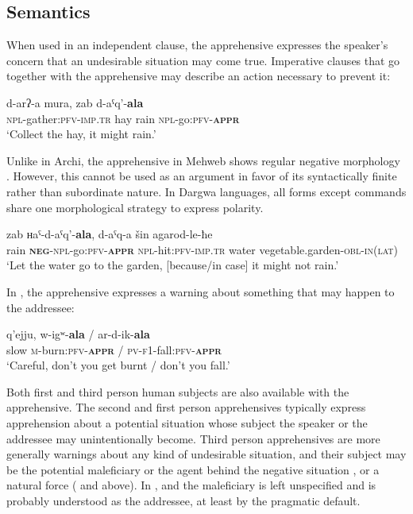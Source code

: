 \documentclass[output=paper,colorlinks,citecolor=brown]{langscibook}
\begin{document}
\subsection{Semantics}
\label{subsec:Msem}
 
When used in an independent clause, the apprehensive expresses the speaker's concern that an undesirable situation may come true. Imperative clauses that go together with the apprehensive may describe an action necessary to prevent it:
 

\ea \label{ex:DD34}
\gll d-arʔ-a mura, zab d-aˤq'-\textbf{ala} \\
\textsc{npl}-gather:\textsc{pfv-imp.tr} hay rain \textsc{npl}-go:\textsc{pfv-\textbf{appr}} \\
\glt `Collect the hay, it might rain.'
\z

 Unlike in Archi, the apprehensive in Mehweb shows regular negative morphology . However, this cannot be used as an argument in favor of its syntactically finite rather than subordinate nature. In Dargwa languages, all forms except commands share one morphological strategy to express polarity.
 
\ea \label{ex:DD35}
\gll zab {ʜaˤ}-d-aˤq'-\textbf{ala}, d-aˤq-a šin agarod-le-ħe \\
rain \textsc{\textbf{neg}-npl-}go:\textsc{pfv-\textbf{appr}} \textsc{npl}-hit:\textsc{pfv-imp.tr} water vegetable.garden-\textsc{obl-in(lat)} \\
\glt `Let the water go to the garden, [because/in case] it might not rain.'
\z


 In , the apprehensive expresses a warning about something that may happen to the addressee:
 
\ea \label{ex:DD36}
\gll q'ejju, w-igʷ-\textbf{ala} \textnormal{/} ar-d-ik-\textbf{ala} \\
slow \textsc{m}-burn:\textsc{pfv-\textbf{appr}} / \textsc{pv-f1}-fall:\textsc{pfv-\textbf{appr}} \\
\glt `Careful, don't you get burnt / don't you fall.'
\z


 Both first and third person human subjects are also available with the apprehensive. The second and first person apprehensives typically express apprehension about a potential situation whose subject the speaker  or the addressee  may unintentionally become. Third person apprehensives are more generally warnings about any kind of undesirable situation, and their subject may be the potential maleficiary  or the agent behind the negative situation , or a natural force ( and  above). In ,  and  the maleficiary is left unspecified and is probably understood as the addressee, at least by the pragmatic default.
\end{document}

